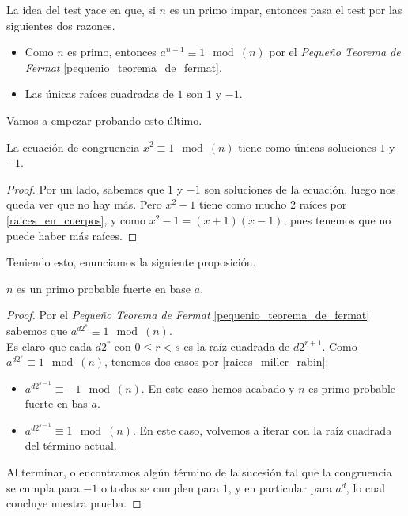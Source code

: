 La idea del test yace en que, si $n$ es un primo impar, entonces pasa el test por las siguientes dos razones.

\begin{itemize}
	\item Como $n$ es primo, entonces $a^{n-1} \equiv 1 \mod(n)$ por el \textit{Pequeño Teorema de Fermat} \ref{pequenio_teorema_de_fermat}.
	
	\item Las únicas raíces cuadradas de $1$ son $1$ y $-1$.
\end{itemize}

Vamos a empezar probando esto último.

\begin{proposicion}\label{raices_miller_rabin}
	La ecuación de congruencia $x^2 \equiv 1 \mod(n)$ tiene como únicas soluciones $1$ y $-1$.
\end{proposicion}

\begin{proof}
	Por un lado, sabemos que $1$ y $-1$ son soluciones de la ecuación, luego nos queda ver que no hay más. Pero $x^2 - 1$ tiene como mucho $2$ raíces por \autoref{raices_en_cuerpos}, y como $x^2 - 1 = (x + 1)(x - 1)$, pues tenemos que no puede haber más raíces.
\end{proof}

Teniendo esto, enunciamos la siguiente proposición.

\begin{proposicion}\label{proposicion_miller_rabin}
	$n$ es un primo probable fuerte en base $a$.
\end{proposicion}

\begin{proof}
	Por el \textit{Pequeño Teorema de Fermat} \ref{pequenio_teorema_de_fermat} sabemos que $a^{d2^s} \equiv 1 \mod(n)$.\\
	
	Es claro que cada $d2^r$ con $0 \leq r < s$ es la raíz cuadrada de $d2^{r+1}$. Como $a^{d2^s} \equiv 1 \mod(n)$, tenemos dos casos por \autoref{raices_miller_rabin}:
	
	\begin{itemize}
		\item $a^{d2^{s-1}} \equiv -1 \mod(n)$. En este caso hemos acabado y $n$ es primo probable fuerte en bas $a$.
		
		\item $a^{d2^{s-1}} \equiv 1 \mod(n)$. En este caso, volvemos a iterar con la raíz cuadrada del término actual.
	\end{itemize}
	
	Al terminar, o encontramos algún término de la sucesión tal que la congruencia se cumpla para $-1$ o todas se cumplen para $1$, y en particular para $a^d$, lo cual concluye nuestra prueba.
\end{proof}

